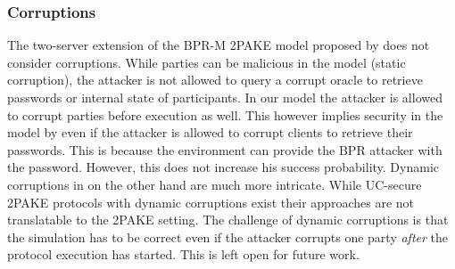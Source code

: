 \subsubsection{Corruptions}
The two-server extension of the \ac{BPR-M} \ac{2PAKE} model proposed by \citet{Katz2012a} does not consider corruptions.
While parties can be malicious in the model (static corruption), the attacker is not allowed to query a corrupt oracle to retrieve passwords or internal state of participants.
In our model the attacker is allowed to corrupt parties before execution as well.
This however implies security in the model by \citet{Katz2012a} even if the attacker is allowed to corrupt clients to retrieve their passwords.
This is because the environment can provide the BPR attacker with the password.
However, this does not increase his success probability.
Dynamic corruptions in \FTWOPAKE on the other hand are much more intricate.
While \ac{UC}-secure \ac{2PAKE} protocols with dynamic corruptions exist \cite{AbdallaBP14a} their approaches are not translatable to the \ac{2PAKE} setting.
The challenge of dynamic corruptions is that the simulation has to be correct even if the attacker corrupts one party \emph{after} the protocol execution has started.
This is left open for future work.
